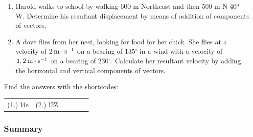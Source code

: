         \label{m38819*id196124}\begin{enumerate}[noitemsep, label=\textbf{\arabic*}. ] 
            \label{m38819*uid71}\item Harold walks to school by walking 600 m Northeast and then 500 m N 40\begin{math}^\text{o}\end{math} W. Determine his resultant displacement by means of addition of components of vectors.\newline
            
\label{m38819*uid72}\item A dove flies from her nest, looking for food for her chick. She flies at a velocity of \begin{math}2\phantom{\rule{2pt}{0ex}}\mathrm{m}\ensuremath{\cdot}\mathrm{s}{}^{-1}\end{math} on a bearing of \begin{math}135{}^{\circ }\end{math} in a wind with a velocity of \begin{math}1,2\phantom{\rule{2pt}{0ex}}\mathrm{m}\ensuremath{\cdot}\mathrm{s}{}^{-1}\end{math} on a bearing of \begin{math}230{}^{\circ }\end{math}. Calculate her resultant velocity by adding the horizontal and vertical components of vectors.\newline
            
\end{enumerate}
        
        


      
      \label{m38819*uid77}
\par {} Find the answers with the shortcodes:
 \par \begin{tabular}[h]{cccccc}
 (1.) l4e  &  (2.) l2Z  & \end{tabular}



            \subsubsection{ Summary}
            \nopagebreak
            
